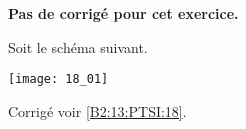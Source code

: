 \normalfalse \difficilefalse \tdifficiletrue
\correctionfalse


\setcounter{question}{0}
\ifcorrection
\else
\textbf{Pas de corrigé pour cet exercice.}
\fi

\ifprof
\else

Soit le schéma suivant. 
\begin{center}
\texttt{[image: 18\_01]}
\end{center}
\fi



\ifprof
\else
\fi



\ifprof
\else
\begin{flushright}
\footnotesize{Corrigé  voir \ref{B2:13:PTSI:18}.}
\end{flushright}%
\fi
